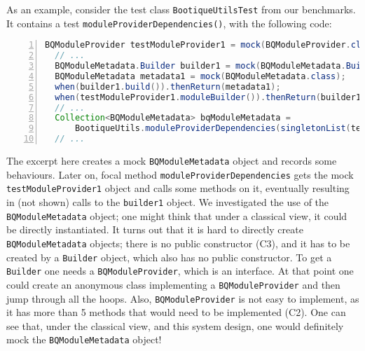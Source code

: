 As an example, consider the test class \texttt{BootiqueUtilsTest} from our benchmarks. It contains a test \texttt{moduleProviderDependencies()}, with the following code:

        \begin{lstlisting}[basicstyle=\ttfamily,
        numbers=left,numbersep=0pt,basicstyle=\scriptsize\ttfamily,language = Java, framesep=4.5mm, framexleftmargin=1.0mm, captionpos=b, escapechar=|, morekeywords={@Test}]
  BQModuleProvider testModuleProvider1 = mock(BQModuleProvider.class);
  // ...
  BQModuleMetadata.Builder builder1 = mock(BQModuleMetadata.Builder.class);
  BQModuleMetadata metadata1 = mock(BQModuleMetadata.class);
  when(builder1.build()).thenReturn(metadata1);
  when(testModuleProvider1.moduleBuilder()).thenReturn(builder1);
  // ...
  Collection<BQModuleMetadata> bqModuleMetadata =
      BootiqueUtils.moduleProviderDependencies(singletonList(testModuleProvider1));
  // ...
      \end{lstlisting}

The excerpt here creates a mock \texttt{BQModuleMetadata} object and records some behaviours.
Later on, focal method \texttt{moduleProviderDependencies} gets the mock \texttt{testModuleProvider1}
object and calls some methods on it, eventually resulting in (not shown) calls to the
\texttt{builder1} object. We investigated the use of the \texttt{BQModuleMetadata} object;
one might think that under a classical view, it could be directly instantiated. It turns out that
it is hard to directly create \texttt{BQModuleMetadata} objects; there is no public constructor (C3), and
it has to be created by a \texttt{Builder} object, which also has no public constructor. 
To get a \texttt{Builder} one needs a \texttt{BQModuleProvider},
which is an interface. At that point one could create an anonymous class implementing a \texttt{BQModuleProvider}
and then jump through all the hoops. Also, \texttt{BQModuleProvider} is not easy to implement, as it has more than 5 methods
that would need to be implemented (C2). One can see that, under the classical view, and this system design, one would definitely
mock the \texttt{BQModuleMetadata} object!


